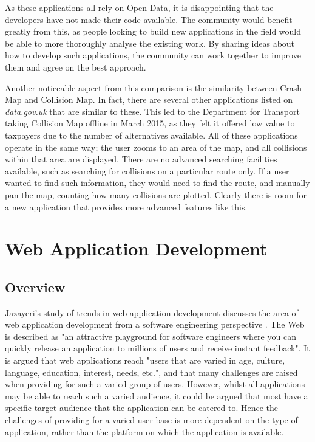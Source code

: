 \documentclass[authoryearcitations]{UoYCSproject}
\begin{document}
As these applications all rely on Open Data, it is disappointing that the developers have not made their code available. The community would benefit greatly from this, as people looking to build new applications in the field would be able to more thoroughly analyse the existing work. By sharing ideas about how to develop such applications, the community can work together to improve them and agree on the best approach.

Another noticeable aspect from this comparison is the similarity between Crash Map and Collision Map. In fact, there are several other applications listed on \textit{data.gov.uk} that are similar to these. This led to the Department for Transport taking Collision Map offline in March 2015, as they felt it offered low value to taxpayers due to the number of alternatives available.  All of these applications operate in the same way; the user zooms to an area of the map, and all collisions within that area are displayed. There are no advanced searching facilities available, such as searching for collisions on a particular route only. If a user wanted to find such information, they would need to find the route, and manually pan the map, counting how many collisions are plotted. Clearly there is room for a new application that provides more advanced features like this.  


\section{Web Application Development}

\subsection{Overview}

Jazayeri's study of trends in web application development discusses the area of web application development from a software engineering perspective \citep{Jazayeri2007}. The Web is described as "an attractive playground for software engineers where you can quickly release an application to millions of users and receive instant feedback". It is argued that web applications reach "users that are varied in age, culture, language, education, interest, needs, etc.", and that many challenges are raised when providing for such a varied group of users. However, whilst all applications may be able to reach such a varied audience, it could be argued that most have a specific target audience that the application can be catered to. Hence the challenges of providing for a varied user base is more dependent on the type of application, rather than the platform on which the application is available. 
\end{document}
